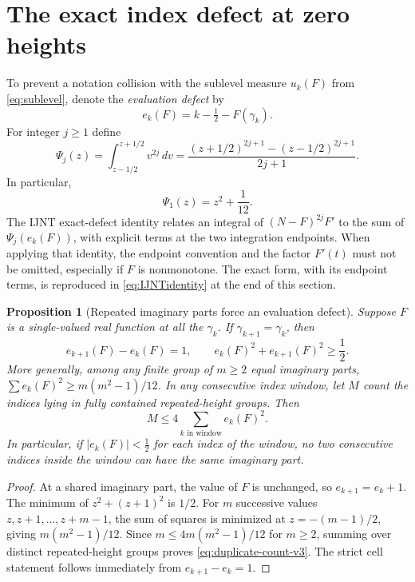 \documentclass[11pt,a4paper]{article}
\numberwithin{equation}{section}
\newtheorem{proposition}[theorem]{Proposition}
\theoremstyle{definition}
\theoremstyle{remark}
\begin{document}
\section{The exact index defect at zero heights}\label{sec:uk-v3}
To prevent a notation collision with the sublevel measure $u_k(F)$
from \eqref{eq:sublevel}, denote the \emph{evaluation defect} by
\begin{equation}\label{eq:ek-v3}
e_k(F)=k-\tfrac12-F(\gamma_k).
\end{equation}
For integer $j\ge1$ define
\begin{equation}\label{eq:Psi-v3}
\Psi_j(z)=\int_{z-1/2}^{z+1/2}v^{2j}\,dv
=\frac{(z+1/2)^{2j+1}-(z-1/2)^{2j+1}}{2j+1}.
\end{equation}
In particular,
\begin{equation}\label{eq:psi1-v3}
\Psi_1(z)=z^2+\frac1{12}.
\end{equation}
The IJNT exact-defect identity relates an integral of $(N-F)^{2j}F'$
to the sum of $\Psi_j(e_k(F))$, with explicit terms at the two
integration endpoints. When applying that identity, the endpoint
convention and the factor $F'(t)$ must not be omitted, especially if
$F$ is nonmonotone. The exact form, with its endpoint terms, is
reproduced in \eqref{eq:IJNTidentity} at the end of this section.

\begin{proposition}[Repeated imaginary parts force an evaluation defect]
\label{prop:duplicate-v3}
Suppose $F$ is a single-valued real function at all the $\gamma_k$.
If $\gamma_{k+1}=\gamma_k$, then
\begin{equation}\label{eq:dup-diff-v3}
e_{k+1}(F)-e_k(F)=1,
\qquad e_k(F)^2+e_{k+1}(F)^2\ge\frac12.
\end{equation}
More generally, among any finite group of $m\ge2$ equal imaginary
parts, $\sum e_k(F)^2\ge m(m^2-1)/12$.
In any consecutive index window, let $M$ count the indices lying in
fully contained repeated-height groups. Then
\begin{equation}\label{eq:duplicate-count-v3}
M\le4\sum_{k\text{ in window}}e_k(F)^2.
\end{equation}
In particular, if $|e_k(F)|<\tfrac12$ for each index of the window,
no two \emph{consecutive indices inside the window} can have the same
imaginary part.
\end{proposition}
\begin{proof}
At a shared imaginary part, the value of $F$ is unchanged, so
$e_{k+1}=e_k+1$. The minimum of $z^2+(z+1)^2$ is $1/2$.
For $m$ successive values $z,z+1,\ldots,z+m-1$, the sum of squares is
minimized at $z=-(m-1)/2$, giving $m(m^2-1)/12$.
Since $m\le4m(m^2-1)/12$ for $m\ge2$, summing over distinct
repeated-height groups proves \eqref{eq:duplicate-count-v3}.
The strict cell statement follows immediately from $e_{k+1}-e_k=1$.
\end{proof}
\end{document}
